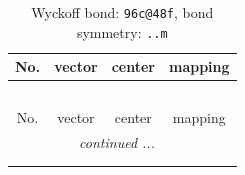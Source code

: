 \documentclass[fleqn,8pt]{jsarticle}
\begin{document}
\renewcommand{\arraystretch}{1.2}
\begin{longtable}{cccc}
\caption{Wyckoff bond: {\tt 96c@48f}, bond symmetry: {\tt ..m}}
 \\
 \hline \hline
No. & vector & center & mapping \\ \hline \endfirsthead

\multicolumn{3}{l}{\tablename\ \thetable{}} \\
 \hline \hline
No. & vector & center & mapping \\ \hline \endhead

 \hline \hline
\multicolumn{3}{r}{\footnotesize\it continued ...} \\ \endfoot

 \hline \hline
\multicolumn{3}{r}{} \\ \endlastfoot


\end{longtable}
\end{document}
